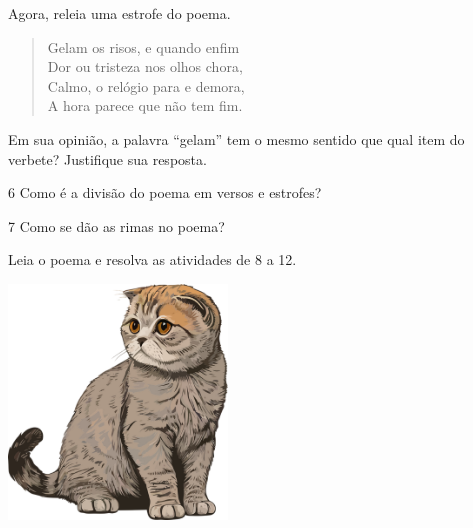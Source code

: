 Agora, releia uma estrofe do poema.

\begin{verse}
Gelam os risos, e quando enfim\\
Dor ou tristeza nos olhos chora,\\
Calmo, o relógio para e demora,\\
A hora parece que não tem fim.
\end{verse}

Em sua opinião, a palavra ``gelam'' tem o mesmo sentido que qual item do verbete? Justifique sua resposta.


\num{6} Como é a divisão do poema em versos e estrofes?


\num{7} Como se dão as rimas no poema?


Leia o poema e resolva as atividades de 8 a 12.



\includegraphics[width=2.29455in,height=2.45833in]{./media/image17.png}


